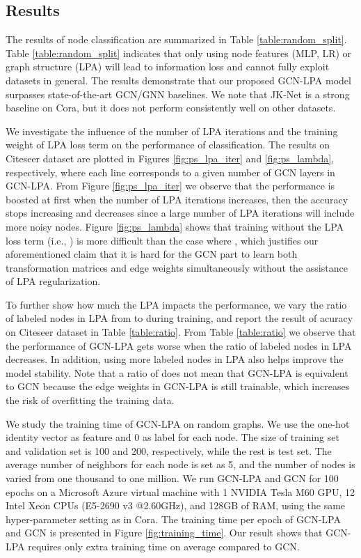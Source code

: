 \documentclass{article}
\begin{document}
		
	\subsection{Results}
		The results of node classification are summarized in Table \ref{table:random_split}.
		Table \ref{table:random_split} indicates that only using node features (MLP, LR) or graph structure (LPA) will lead to information loss and cannot fully exploit datasets in general.
		The results demonstrate that our proposed GCN-LPA model surpasses state-of-the-art GCN/GNN baselines.
We note that JK-Net is a strong baseline on Cora, but it does not perform consistently well on other datasets.
		
		We investigate the influence of the number of LPA iterations and the training weight of LPA loss term  on the performance of classification.
		The results on Citeseer dataset are plotted in Figures \ref{fig:ps_lpa_iter} and \ref{fig:ps_lambda}, respectively, where each line corresponds to a given number of GCN layers in GCN-LPA.
		From Figure \ref{fig:ps_lpa_iter} we observe that the performance is boosted at first when the number of LPA iterations increases, then the accuracy stops increasing and decreases since a large number of LPA iterations will include more noisy nodes.
		Figure \ref{fig:ps_lambda} shows that training without the LPA loss term (i.e., ) is more difficult than the case where , which justifies our aforementioned claim that it is hard for the GCN part to learn both transformation matrices  and edge weights  simultaneously without the assistance of LPA regularization.
		
		To further show how much the LPA impacts the performance, we vary the ratio of labeled nodes in LPA from  to  during training, and report the result of acuracy on Citeseer dataset in Table \ref{table:ratio}.
		From Table \ref{table:ratio} we observe that the performance of GCN-LPA gets worse when the ratio of labeled nodes in LPA decreases.
		In addition, using more labeled nodes in LPA also helps improve the model stability.
		Note that a ratio of  does not mean that GCN-LPA is equivalent to GCN \citep{kipf2017semi} because the edge weights in GCN-LPA is still trainable, which increases the risk of overfitting the training data.
		
		We study the training time of GCN-LPA on random graphs.
		We use the one-hot identity vector as feature and 0 as label for each node.
		The size of training set and validation set is 100 and 200, respectively, while the rest is test set.
		The average number of neighbors for each node is set as 5, and the number of nodes is varied from one thousand to one million.
		We run GCN-LPA and GCN for 100 epochs on a Microsoft Azure virtual machine with 1 NVIDIA Tesla M60 GPU, 12 Intel Xeon CPUs (E5-2690 v3 @2.60GHz), and 128GB of RAM, using the same hyper-parameter setting as in Cora.
		The training time per epoch of GCN-LPA and GCN is presented in Figure \ref{fig:training_time}.
		Our result shows that GCN-LPA requires only  extra training time on average compared to GCN.
	
\end{document}
